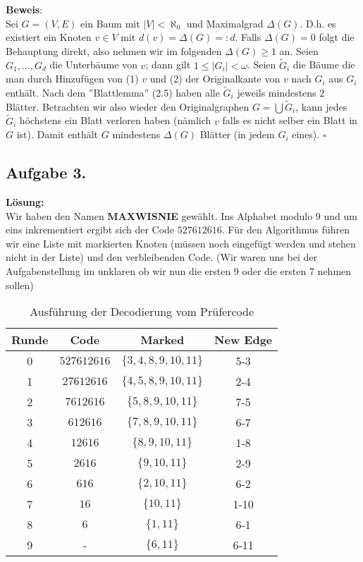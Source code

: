 \documentclass[11pt,a4paper,ngerman]{article}
\begin{document}
\textbf{Beweis}:\\
Sei $G=(V,E)$ ein Baum mit $|V| < \aleph_0$ und Maximalgrad $\Delta(G)$.
D.h. es existiert ein Knoten $v \in V$ mit $d(v) = \Delta(G) =: d$. 
Falls $\Delta(G) = 0$
folgt die Behauptung direkt, also nehmen wir im folgenden $\Delta(G) \geq 1$ an.
Seien $G_1,\ldots,G_d$ die Unterbäume von $v$; dann gilt $1\leq |G_i| < \omega$. 
Seien $\tilde{G}_i$ die Bäume die man durch Hinzufügen von
(1) $v$ und (2) der Originalkante von $v$ nach $G_i$ aus $G_i$ enthält.
Nach dem ''Blattlemma'' (2.5) haben alle $\tilde{G}_i$ jeweils mindestens $2$ Blätter.
Betrachten wir also wieder den Originalgraphen $G = \bigcup \tilde{G}_i$, kann jedes
$\tilde{G}_i$ höchstens ein Blatt verloren haben (nämlich $v$ falls es nicht selber ein Blatt in $G$ ist). 
Damit enthält $G$ mindestens $\Delta(G)$ Blätter (in jedem $G_i$ eines).
\mbox{}\hfill$\square$

\pagebreak

\subsection*{Aufgabe 3.}
\textbf{Lösung:}\\

Wir haben den Namen \textbf{MAXWISNIE} gewählt. Ins Alphabet modulo $9$ und um eins inkrementiert ergibt sich der Code
$527612616$. Für den Algorithmus führen wir eine Liste mit markierten Knoten (müssen noch eingefügt werden
und stehen nicht in der Liste) und den verbleibenden Code. (Wir waren uns bei der Aufgabenstellung im unklaren ob
wir nun die ersten 9 oder die ersten 7 nehmen sollen)
\begin{table}[h!]
\centering
\begin{tabularx}{0.6\textwidth}{c|ccc}
Runde & Code & Marked & New Edge\\
\hline
0 & $527612616$ &  $\{3, 4, 8, 9, 10, 11\}$ & 5-3\\
1 & $27612616$ & $\{ 4, 5, 8, 9, 10, 11\}$ & 2-4\\
2 & $7612616$ & $\{ 5, 8, 9, 10, 11\}$ & 7-5\\
3 & $612616$ & $\{ 7, 8, 9, 10, 11\}$ & 6-7\\
4 & $12616$ & $\{ 8, 9, 10, 11\}$ & 1-8\\
5 & $2616$ & $\{ 9, 10, 11\}$ & 2-9\\
6 & $616$ & $\{ 2, 10, 11\}$ & 6-2\\
7 & $16$ & $\{ 10, 11\}$ & 1-10\\
8 & $6$ & $\{ 1, 11\}$ &6-1\\
9 & - & $\{ 6, 11\}$ & 6-11
\end{tabularx}
\caption{Ausführung der Decodierung vom Prüfercode}
\end{table}
\end{document}
